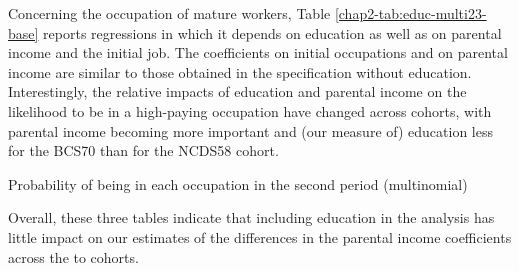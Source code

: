 Concerning the occupation of mature workers, Table \ref{chap2-tab:educ-multi23-base} reports regressions in which it depends on education as well as on parental income and the initial job. The coefficients on initial occupations and on parental income are similar to those obtained in the specification without education. Interestingly, the relative impacts of education and parental income on the likelihood to be in a high-paying occupation have changed across cohorts, with parental income becoming more important  and (our measure of) education less for the BCS70 than for the NCDS58 cohort.

\begin{table}[!htb]
    \centering
    \caption{Probability of being in each occupation in the second period (multinomial)}
    \label{chap2-tab:educ-multi23-base}
\end{table}
Overall, these three tables indicate that including education in the analysis has little impact on our estimates of the differences in the parental income coefficients across the to cohorts.
